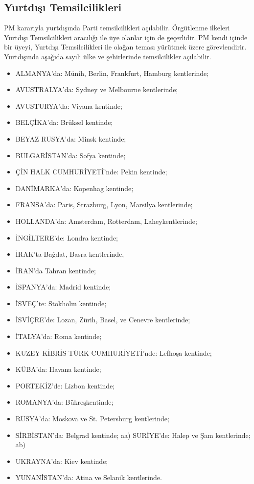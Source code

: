 \documentclass[11pt]{article} %
\begin{document}
\subsection{Yurtdışı Temsilcilikleri}
PM kararıyla yurtdışında Parti temsilcilikleri açılabilir. Örgütlenme ilkeleri Yurtdışı Temsilcilikleri aracılıǧı ile üye olanlar için de geçerlidir. PM kendi içinde bir üyeyi, Yurtdışı Temsilcilikleri ile olaǧan teması yürütmek üzere görevlendirir. Yurtdışında aşaǧıda sayılı ülke ve şehirlerinde temsilcilikler açılabilir.
\begin{itemize}
\item ALMANYA’da: Münih, Berlin, Frankfurt, Hamburg kentlerinde;
\item AVUSTRALYA’da: Sydney ve Melbourne kentlerinde;
\item AVUSTURYA’da: Viyana kentinde;
\item BELÇİKA’da: Brüksel kentinde;
\item BEYAZ RUSYA’da: Minsk kentinde;
\item BULGARİSTAN’da: Sofya kentinde;
\item ÇİN HALK CUMHURİYETİ’nde: Pekin kentinde;
\item DANİMARKA’da: Kopenhag kentinde;
\item FRANSA’da: Paris, Strazburg, Lyon, Marsilya kentlerinde;
\item HOLLANDA’da: Amsterdam, Rotterdam, Laheykentlerinde;
\item İNGİLTERE’de: Londra kentinde;
\item İRAK’ta Baǧdat, Basra kentlerinde,
\item İRAN’da Tahran kentinde;
\item İSPANYA’da: Madrid kentinde;
\item İSVEÇ’te: Stokholm kentinde;
\item İSVİÇRE’de: Lozan, Zürih, Basel, ve Cenevre kentlerinde;
\item İTALYA’da: Roma kentinde;
\item KUZEY KİBRİS TÜRK CUMHURİYETİ’nde: Lefhoşa kentinde;
\item KÜBA’da: Havana kentinde;
\item PORTEKİZ’de: Lizbon kentinde;
\item ROMANYA’da: Bükreşkentinde;
\item RUSYA’da: Moskova ve St. Petersburg kentlerinde;
\item SİRBİSTAN’da: Belgrad kentinde; aa) SURİYE’de: Halep ve Şam kentlerinde; ab) \item UKRAYNA’da: Kiev kentinde;
\item YUNANİSTAN’da: Atina ve Selanik kentlerinde.
\end{itemize}
\end{document}
